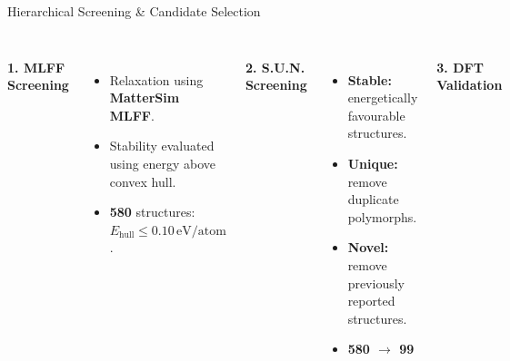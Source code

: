 \documentclass[aspectratio=169, 11pt]{beamer}
\begin{document}
\begin{frame}{Hierarchical Screening \& Candidate Selection}
\begin{tabular}{c@{\quad$\rightarrow$\quad}c@{\quad$\rightarrow$\quad}c@{\quad$\rightarrow$\quad}c@{\quad$\rightarrow$\quad}c}
    \end{tabular}

    \vspace{0.32cm}

    \begin{columns}[T]


        \textbf{1. MLFF Screening}

        \vspace{0.01cm}

        {\footnotesize
        \begin{itemize}
            \setlength{\itemsep}{1pt}

            \item Relaxation using
            \textbf{MatterSim MLFF}. \cite{mattersim2024}

            \item Stability evaluated using
            energy above convex hull.

            \item \textbf{580} structures:
            $E_{\mathrm{hull}}\leq0.10\,\mathrm{eV/atom}$.
        \end{itemize}
        }


        \textbf{2. S.U.N. Screening} \cite{battery_mattergen2025}

        \vspace{0.01cm}

        {\footnotesize
        \begin{itemize}
            \setlength{\itemsep}{1pt}

            \item \textbf{Stable:} energetically
            favourable structures.

            \item \textbf{Unique:} remove duplicate
            polymorphs.

            \item \textbf{Novel:} remove previously
            reported structures.

            \item \textbf{580 $\rightarrow$ 99}
        \end{itemize}
        }


        \textbf{3. DFT Validation}\cite{battery_mattergen2025}


\end{columns}
\end{frame}
\end{document}
